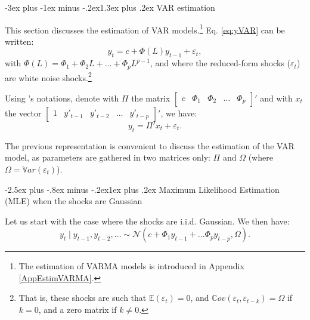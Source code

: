\documentclass[
  11pt,
]{book}
\makeatletter
\renewcommand\section{\@startsection{section}{1}{\z@}
  {-3ex plus -1ex minus -.2ex}{1.3ex plus .2ex}
  {\normalfont\Large\bfseries\color{TextbookInk}}}
\renewcommand\subsection{\@startsection{subsection}{2}{\z@}
  {-2.5ex plus -.8ex minus -.2ex}{1ex plus .2ex}
  {\normalfont\large\bfseries\color{TextbookInk}}}
\theoremstyle{definition}
\theoremstyle{definition}
\theoremstyle{definition}
\theoremstyle{definition}
\theoremstyle{remark}
\makeatother
\begin{document}
\section{VAR estimation}\label{estimVAR}

This section discusses the estimation of VAR models.\footnote{The estimation of VARMA models is introduced in Appendix \ref{AppEstimVARMA}.} Eq. \eqref{eq:yVAR} can be written:
\[
y_{t}=c+\Phi(L)y_{t-1}+\varepsilon_{t},
\]
with \(\Phi(L) = \Phi_1 + \Phi_2 L + \dots + \Phi_p L^{p-1}\), and where the reduced-form shocks (\(\varepsilon_{t}\)) are white noise shocks.\footnote{That is, these shocks are such that \(\mathbb{E}(\varepsilon_{t})=0\), and \(\mathbb{C}ov(\varepsilon_{t},\varepsilon_{t-k})=\Omega\) if \(k=0\), and a zero matrix if \(k \ne 0\).}

Using \citet{Hamilton_1994}'s notations, denote with \(\Pi\) the matrix \(\left[\begin{array}{ccccc}
c & \Phi_{1} & \Phi_{2} & \ldots & \Phi_{p}\end{array}\right]'\) and with \(x_{t}\) the vector \(\left[\begin{array}{ccccc}
1 & y'_{t-1} & y'_{t-2} & \ldots & y'_{t-p}\end{array}\right]'\), we have:
\begin{equation}
y_{t}= \Pi'x_{t} + \varepsilon_{t}.
\label{eq:PIVAR}
\end{equation}

The previous representation is convenient to discuss the estimation of the VAR model, as parameters are gathered in two matrices only: \(\Pi\) and \(\Omega\) (where \(\Omega = \mathbb{V}ar (\varepsilon_t)\)).

\subsection{Maximum Likelihood Estimation (MLE) when the shocks are Gaussian}\label{maximum-likelihood-estimation-mle-when-the-shocks-are-gaussian}

Let us start with the case where the shocks are i.i.d. Gaussian. We then have:
\[
y_{t}\mid y_{t-1},y_{t-2},\ldots\sim \mathcal{N}(c+\Phi_{1}y_{t-1}+\ldots\Phi_{p}y_{t-p},\Omega).
\]
\end{document}
